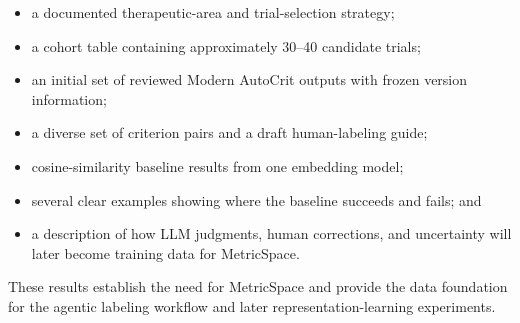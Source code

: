 \documentclass[11pt]{article}
\begin{document}
\begin{itemize}
    \item a documented therapeutic-area and trial-selection strategy;
    \item a cohort table containing approximately 30--40 candidate trials;
    \item an initial set of reviewed Modern AutoCrit outputs with frozen version information;
    \item a diverse set of criterion pairs and a draft human-labeling guide;
    \item cosine-similarity baseline results from one embedding model;
    \item several clear examples showing where the baseline succeeds and fails; and
    \item a description of how LLM judgments, human corrections, and uncertainty will later become training data for MetricSpace.
\end{itemize}

These results establish the need for MetricSpace and provide the data foundation for the agentic labeling workflow and later representation-learning experiments.
\end{document}
